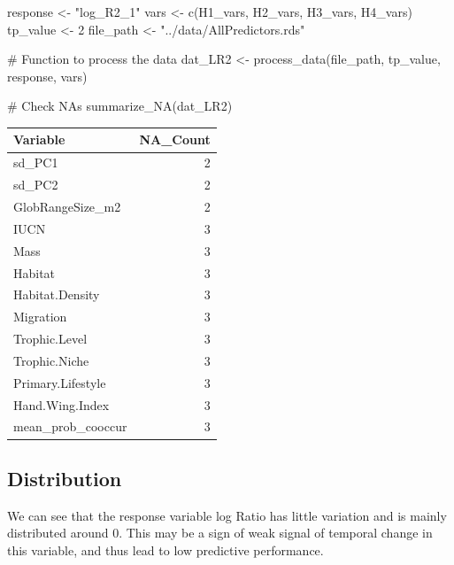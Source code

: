 \documentclass[
  letterpaper,
  DIV=11,
  numbers=noendperiod]{scrreprt}
\newenvironment{Shaded}{\begin{snugshade}}{\end{snugshade}}
\newcommand{\CommentTok}[1]{\textcolor[rgb]{0.37,0.37,0.37}{#1}}
\newcommand{\DecValTok}[1]{\textcolor[rgb]{0.68,0.00,0.00}{#1}}
\newcommand{\FunctionTok}[1]{\textcolor[rgb]{0.28,0.35,0.67}{#1}}
\newcommand{\NormalTok}[1]{\textcolor[rgb]{0.00,0.23,0.31}{#1}}
\newcommand{\OtherTok}[1]{\textcolor[rgb]{0.00,0.23,0.31}{#1}}
\newcommand{\StringTok}[1]{\textcolor[rgb]{0.13,0.47,0.30}{#1}}
\begin{document}
\begin{Shaded}
\begin{Highlighting}[]
\NormalTok{response }\OtherTok{\textless{}{-}} \StringTok{"log\_R2\_1"}
\NormalTok{vars }\OtherTok{\textless{}{-}} \FunctionTok{c}\NormalTok{(H1\_vars, H2\_vars, H3\_vars, H4\_vars)}
\NormalTok{tp\_value }\OtherTok{\textless{}{-}} \DecValTok{2}
\NormalTok{file\_path }\OtherTok{\textless{}{-}} \StringTok{"../data/AllPredictors.rds"}

\CommentTok{\# Function to process the data}
\NormalTok{dat\_LR2 }\OtherTok{\textless{}{-}} \FunctionTok{process\_data}\NormalTok{(file\_path, tp\_value, response, vars)}

\CommentTok{\# Check NAs}
\FunctionTok{summarize\_NA}\NormalTok{(dat\_LR2)}
\end{Highlighting}
\end{Shaded}

\begin{longtable}[]{@{}lr@{}}
\toprule\noalign{}
Variable & NA\_Count \\
\midrule\noalign{}
\endhead
\bottomrule\noalign{}
\endlastfoot
sd\_PC1 & 2 \\
sd\_PC2 & 2 \\
GlobRangeSize\_m2 & 2 \\
IUCN & 3 \\
Mass & 3 \\
Habitat & 3 \\
Habitat.Density & 3 \\
Migration & 3 \\
Trophic.Level & 3 \\
Trophic.Niche & 3 \\
Primary.Lifestyle & 3 \\
Hand.Wing.Index & 3 \\
mean\_prob\_cooccur & 3 \\
\end{longtable}

\subsection{Distribution}

We can see that the response variable log Ratio has little variation and
is mainly distributed around 0. This may be a sign of weak signal of
temporal change in this variable, and thus lead to low predictive
performance.
\end{document}
